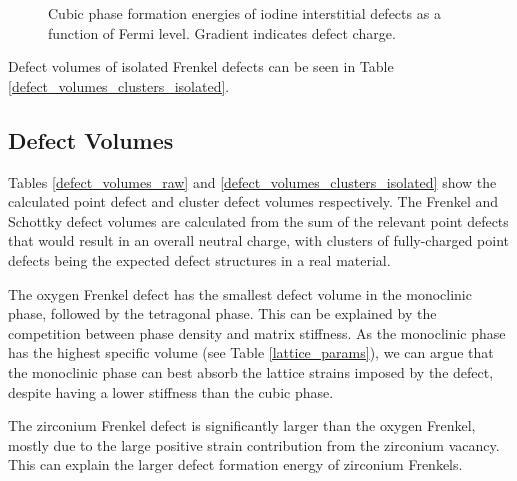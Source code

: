\begin{figure}[ht]
\begin{center}
		\caption{Cubic phase formation energies of iodine interstitial defects as a function of Fermi level. Gradient indicates defect charge.}
		\label{figure:cubicinter}
	\end{center}
\end{figure}

Defect volumes of isolated Frenkel defects can be seen in Table \ref{defect_volumes_clusters_isolated}.


\subsection{Defect Volumes}

Tables \ref{defect_volumes_raw} and \ref{defect_volumes_clusters_isolated} show the calculated point defect and cluster defect volumes respectively. The Frenkel and Schottky defect volumes are calculated from the sum of the relevant point defects that would result in an overall neutral charge, with clusters of fully-charged point defects being the expected defect structures in a real material.

The oxygen Frenkel defect has the smallest defect volume in the monoclinic phase, followed by the tetragonal phase. This can be explained by the competition between phase density and matrix stiffness. As the monoclinic phase has the highest specific volume (see Table \ref{lattice_params}), we can argue that the monoclinic phase can best absorb the lattice strains imposed by the defect, despite having a lower stiffness than the cubic phase.

The zirconium Frenkel defect is significantly larger than the oxygen Frenkel, mostly due to the large positive strain contribution from the zirconium vacancy. This can explain the larger defect formation energy of zirconium Frenkels.

